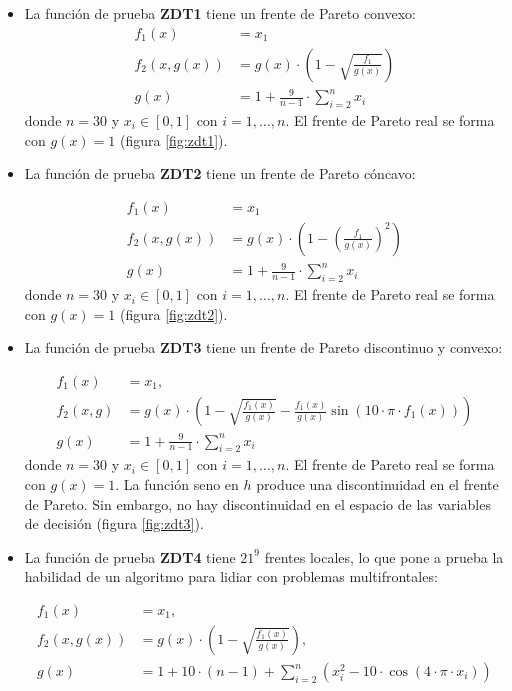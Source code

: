 \begin{itemize}
 
\item La funci\'on de prueba \textbf{ZDT1} tiene un frente de Pareto convexo:
\begin{align*}
f_1(x)&=x_1\\
f_2(x,g(x))&=g(x)\cdot\left(1-\sqrt{ \frac{f_1}{g(x)}}\right)\\
g(x)&=1+\frac{9}{n-1}\cdot\sum_{i=2}^nx_i
\end{align*}
donde $n=30$ y $x_i\in[0,1]$ con $i=1,\ldots, n$. El frente de Pareto real se forma con $g(x)=1$ (figura \ref{fig:zdt1}).

\item La funci\'on de prueba \textbf{ZDT2} tiene un frente de Pareto c\'oncavo:

\begin{align*}
f_1(x)&=x_1\\
f_2(x,g(x))&=g(x)\cdot(1- \left( \frac{f_1}{g(x)}\right)^2)\\
g(x)&=1+\frac{9}{n-1}\cdot\sum_{i=2}^nx_i
\end{align*}
donde $n=30$ y $x_i\in[0,1]$ con $i=1,\ldots, n$. El frente de Pareto real se forma con $g(x)=1$ (figura \ref{fig:zdt2}).

\item La funci\'on de prueba \textbf{ZDT3} tiene un frente de Pareto discontinuo y convexo:

\begin{align*}
f_1(x)&=x_1,\\
f_2(x,g)&=g(x)\cdot\left(1-\sqrt{\frac{f_1(x)}{g(x)}}-\frac{f_1(x)}{g(x)}\sin(10\cdot\pi\cdot f_1(x))\right)\\
g(x)&=1+\frac{9}{n-1}\cdot\sum_{i=2}^nx_i
\end{align*}
donde $n=30$ y $x_i\in[0,1]$ con $i=1,\ldots, n$. El frente de Pareto real se forma con $g(x)=1$. La funci\'on seno
en $h$ produce una discontinuidad en el frente de Pareto. Sin embargo, no hay discontinuidad en el espacio de las variables 
de decisi\'on (figura \ref{fig:zdt3}).

\item La funci\'on de prueba \textbf{ZDT4} tiene $21^9$ frentes locales, lo que pone a prueba la habilidad de un 
algoritmo para lidiar con problemas multifrontales:

\begin{align*}
f_1(x)&=x_1,\\
f_2(x,g(x))&=g(x)\cdot \left(1-\sqrt{ \frac{f_1(x)}{g(x)}}\right),\\
g(x)&=1+10\cdot(n-1)+ \sum_{i=2}^n(x_i^2-10\cdot \cos(4\cdot\pi\cdot x_i))
\end{align*}


\end{itemize}
